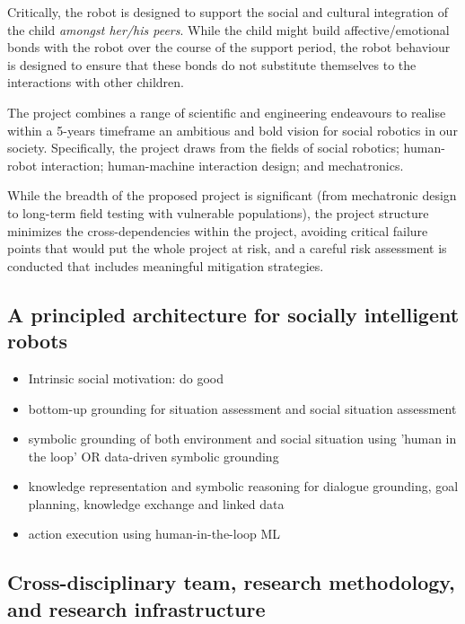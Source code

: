 \documentclass[]{article}
\begin{document}
Critically, the robot is designed to support the social and cultural
integration of the child \emph{amongst her/his peers}. While the child
might build affective/emotional bonds with the robot over the course of
the support period, the robot behaviour is designed to ensure that these
bonds do not substitute themselves to the interactions with other
children.

The project combines a range of scientific and engineering endeavours to
realise within a 5-years timeframe an ambitious and bold vision for
social robotics in our society. Specifically, the project draws from the
fields of social robotics; human-robot interaction; human-machine
interaction design; and mechatronics.

While the breadth of the proposed project is significant (from
mechatronic design to long-term field testing with vulnerable
populations), the project structure minimizes the cross-dependencies
within the project, avoiding critical failure points that would put the
whole project at risk, and a careful risk assessment is conducted that
includes meaningful mitigation strategies.




\subsection{A principled architecture for socially intelligent robots}


\begin{itemize}
    \item Intrinsic social motivation: do good
    \item bottom-up grounding for situation assessment and social situation
        assessment
    \item symbolic grounding of both environment and social situation using
        'human in the loop' OR data-driven symbolic grounding
    \item knowledge representation and symbolic reasoning for dialogue
        grounding, goal planning, knowledge exchange and linked data
    \item action execution using human-in-the-loop ML
\end{itemize}


\subsection{Cross-disciplinary team, research methodology, and research
infrastructure}
\end{document}
